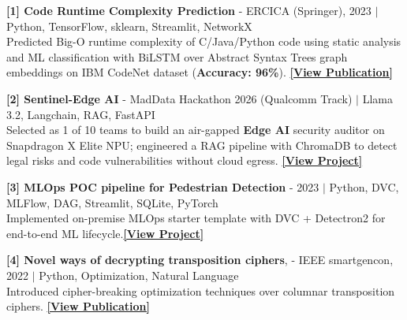 \documentclass[letterpaper,11pt]{article}
\makeatletter
\newcommand{\resumeSubheading}[4]{
  \vspace{-2pt}\item
    \begin{tabular*}{0.97\textwidth}[t]{l@{\extracolsep{\fill}}r}
      \textbf{#1} & #2 \\
      \small#3 & \small #4 \\
    \end{tabular*}\vspace{-7pt}
}
\newcommand{\resumeSubHeadingListStart}{\begin{itemize}[leftmargin=0.15in, label={}]}
\makeatother
\begin{document}
    \begin{itemize}[leftmargin=0.15in, label={}]
    \small{\item{
    \textbf{[1] Code Runtime Complexity Prediction} {- ERCICA (Springer), 2023 $|$ Python, TensorFlow, sklearn, Streamlit, NetworkX }\\
    {Predicted Big-O runtime complexity of C/Java/Python code using static analysis and ML classification with BiLSTM over Abstract Syntax Trees graph embeddings on IBM CodeNet dataset (\textbf{Accuracy: 96\%}).} {\href{https://doi.org/10.1007/978-981-99-7622-5_26}{\textbf{[View Publication]}}}\vspace{0.5pt}

    \textbf{[2] Sentinel-Edge AI} {- MadData Hackathon 2026 (Qualcomm Track) $|$ Llama 3.2, Langchain, RAG, FastAPI} \\
    {Selected as 1 of 10 teams to build an air-gapped \textbf{Edge AI} security auditor on Snapdragon X Elite NPU; engineered a RAG pipeline with ChromaDB to detect legal risks and code vulnerabilities without cloud egress.} {\href{https://github.com/NikhilAdyapak/SentinelAI}{\textbf{[View Project]}}}\vspace{0.5pt}

    \textbf{[3] MLOps POC pipeline for Pedestrian Detection} {- 2023 $|$ Python, DVC, MLFlow, DAG, Streamlit, SQLite, PyTorch} \\
    {Implemented on-premise MLOps starter template with DVC + Detectron2 for end-to-end ML lifecycle.}{\href{https://github.com/NikhilAdyapak/DVC_Detectron2}{\textbf{[View Project]}}}}\vspace{0.5pt}
     
     \textbf{[4] Novel ways of decrypting transposition ciphers}, {- IEEE smartgencon, 2022} $|$ Python, Optimization, Natural Language\\
     {Introduced cipher-breaking optimization techniques over columnar transposition ciphers. {\href{https://doi.org/10.1109/SMARTGENCON56628.2022.10083631}{\textbf{[View Publication]}}
     }}
     }
    \end{itemize}


\end{document}
